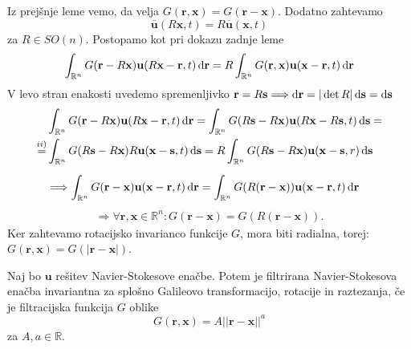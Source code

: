 \documentclass[mat2, tisk]{fmfdelo}
\newcommand{\R}{\mathbb R}
\newcommand{\bd}{\textbf}
\begin{document}
\begin{dokaz}
Iz prejšnje leme vemo, da velja $G(\bd{r}, \bd{x}) = G(\bd{r} - \bd{x})$. Dodatno zahtevamo 
$$
\overline{\bd{u}}(R\bd{x}, t) = R \overline{\bd{u}}(\bd{x}, t)
$$
za $R\in SO(n)$. Postopamo kot pri dokazu zadnje leme 
$$\int_{\R^n} G(\bd{r} - R\bd{x}) \bd{u}(R\bd{x} - \bd{r}, t)\dif \bd{r} = R \int_{\R^n} G(\bd{r}, \bd{x}) \bd{u}(\bd{x} - \bd{r}, t)\dif \bd{r}$$
V levo stran enakosti uvedemo spremenljivko $\bd{r} = R \bd{s} \Longrightarrow \dif \bd{r} = |\det{R}| \dif \bd{s} = \dif \bd{s}$
\begin{align*}
&\int_{\R^n} G(\bd{r} - R\bd{x}) \bd{u}(R\bd{x} - \bd{r}, t)\dif \bd{r} = \int_{\R^n} G(R\bd{s} - R\bd{x}) \bd{u}(R\bd{x} - R\bd{s}, t)\dif \bd{s} = \\
\stackrel{ii)}{=} &\int_{\R^n} G(R\bd{s} - R\bd{x}) R\bd{u}(\bd{x} - \bd{s}, t)\dif \bd{s} = R\int_{\R^n} G(R\bd{s} - R\bd{x}) \bd{u}(\bd{x} - \bd{s}, r)\dif \bd{s}\\[2mm]
&\Longrightarrow \int_{\R^n} G(\bd{r} - \bd{x}) \bd{u}(\bd{x} - \bd{r}, t)\dif \bd{r} = \int_{\R^n} G(R(\bd{r} - \bd{x})) \bd{u}(\bd{x} - \bd{r}, t)\dif \bd{r}
\end{align*}
\begin{align*}
\Longrightarrow \forall \bd{r}, \bd{x}\in \R^n: G(\bd{r} - \bd{x}) = G(R(\bd{r} - \bd{x})).
\end{align*}
Ker zahtevamo rotacijsko invarianco funkcije $G$, mora biti radialna, torej:\\ $G(\bd{r}, \bd{x}) = G(|\bd{r} - \bd{x}|)$.
\end{dokaz}

\begin{lema}
Naj bo $\bd{u}$ rešitev Navier-Stokesove enačbe. Potem je filtrirana Navier-Stokesova enačba 
invariantna za splošno Galileovo transformacijo, rotacije in raztezanja, če je filtracijska funkcija $G$ oblike
$$
G(\bd{r}, \bd{x}) = A||\bd{r} - \bd{x}||^a
$$
za $A, a\in \R$.
\end{lema}
\end{document}
